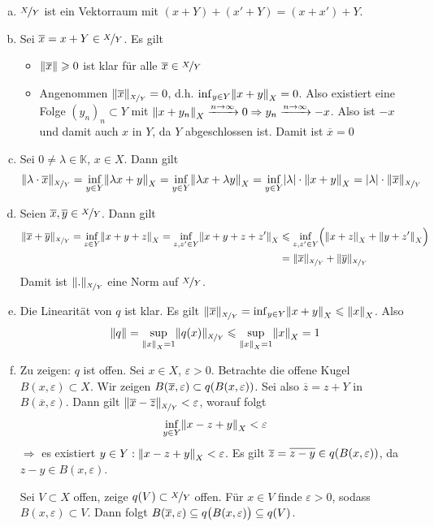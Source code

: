 \begin{enumerate}[a)]
	\item $\nicefrac{X}{Y}$ ist ein Vektorraum mit $(x+Y) + (x'+Y) = (x+x') + Y$.
	\item Sei $\overline{x} = x+ Y \in \nicefrac{X}{Y}$. Es gilt
	\begin{itemize}
		\item $\norm{\overline{x}} \ge 0 $ ist klar für alle $\overline{x} \in \nicefrac{X}{Y}$
		\item Angenommen $\norm[\nicefrac{X}{Y}]{\overline{x}} =0$, d.h. $\inf_{y \in Y} \norm[X]{x+y} =0$. Also existiert eine Folge $(y_n)_n \subset Y$ mit
		$\norm[X]{x+y_n} \xrightarrow{n \to \infty} 0 \Rightarrow y_n \xrightarrow{n \to \infty} -x$. Also ist $-x$ und damit auch $x$ in $Y$, da $Y$ abgeschlossen ist.
		Damit ist $\overline{x}=0 $ 
	\end{itemize}
	\item Sei $0 \not= \lambda \in \mathds{K}$, $x \in X$. Dann gilt
	\begin{align*}
		\norm[\nicefrac{X}{Y}]{\lambda \cdot \overline{x}} = \inf_{y \in Y} \norm[X]{\lambda x + y} = \inf_{y \in Y} \norm[X]{\lambda x + \lambda y} 
		= \inf_{y \in Y} \abs*{\lambda } \cdot \norm[X]{x+y}  =   \abs*{\lambda } \cdot \norm[\nicefrac{X}{Y}]{\overline{x}}  
	\end{align*}
	\item Seien $\overline{x}, \overline{y} \in \nicefrac{X}{Y}$. Dann gilt
	\begin{align*}
		\norm[\nicefrac{X}{Y}]{\overline{x} + \overline{y}} = \inf_{z \in Y} \norm[X]{x+y+z} = \inf_{z,z' \in Y} \norm[X]{x+y+z+z'} &\le \inf_{z,z' \in Y}
		\enbrace[\Big]{\norm[X]{x+z} + \norm[X]{y+z'}} \\ &= \norm[\nicefrac{X}{Y}]{\overline{x}} + \norm[\nicefrac{X}{Y}]{\overline{y}}
	\end{align*}
	Damit ist $\norm[\nicefrac{X}{Y}]{.}$ eine Norm auf $\nicefrac{X}{Y}$.
	\item Die Linearität von $q$ ist klar. Es gilt
	\(
		\norm[\nicefrac{X}{Y}]{\overline{x}} = \inf_{y \in Y} \norm[X]{x+y} \le \norm[X]{x}   
	\). Also
	\[
		\norm{q} = \sup_{\norm[X]{x}=1} \norm[\nicefrac{X}{Y}]{q(x)} \le \sup_{\norm[X]{x}=1 } \norm[X]{x} = 1   
	\]
	\item Zu zeigen: $q$ ist offen. Sei $x \in X$, $\varepsilon>0$. Betrachte die offene Kugel $B(x,\varepsilon) \subset X$. Wir zeigen 
	$B(\overline{x}, \varepsilon) \subset q \enbrace*{B(x,\varepsilon)}$. Sei also $\overline{z} = z + Y$ in $B(\overline{x},\varepsilon)$. Dann gilt
	$\norm[\nicefrac{X}{Y}]{\overline{x}- \overline{z}} < \varepsilon$, worauf folgt
	\[
		\inf_{y \in Y} \norm[X]{x-z+y} < \varepsilon 
	\]
	$\Rightarrow$ es existiert $y \in Y : \norm[X]{x-z+y}<\varepsilon $. Es gilt $\overline{z}=\overline{z-y}\in q\enbrace*{B(x,\varepsilon)}$, da $z-y\in B(x,\varepsilon)$.
	
	Sei $V \subset X$ offen, zeige $q(V) \subset \nicefrac{X}{Y}$ offen. Für $x \in V$ finde $\varepsilon>0$, sodass $B(x,\varepsilon) \subset V$. Dann folgt
	$B(\overline{x},\varepsilon) \subseteq q \enbrace[\big]{ B(x,\varepsilon)} \subseteq q(V)$. \bewende
\end{enumerate}

